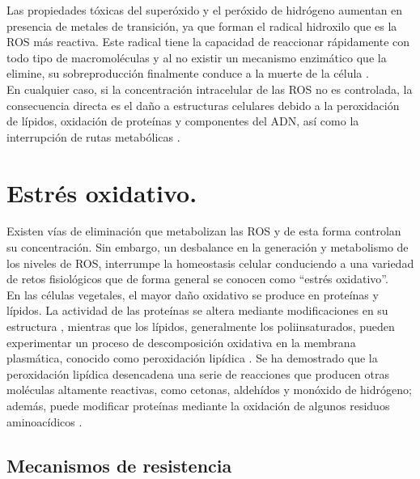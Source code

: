Las propiedades tóxicas del super\'oxido y el per\'oxido de hidr\'ogeno aumentan en presencia de metales de transici\'on, ya que forman el radical hidroxilo que es la ROS más reactiva. Este radical tiene la capacidad de reaccionar rápidamente con todo tipo de macromoléculas y al no existir un mecanismo enzimático que la elimine, su sobreproducción finalmente conduce a la muerte de la c\'elula \citep{moller2007oxidative, sharma2009relationship, gill2010reactive}.\\

En cualquier caso, si la concentración intracelular de las ROS no es controlada, la consecuencia directa es el daño a estructuras celulares debido a la peroxidación de lípidos, oxidación de proteínas y componentes del ADN, así como la interrupción de rutas metabólicas \citep{moller2007oxidative, imlay2008cellular}.\\

\section{Estr\'es oxidativo.}

Existen v\'ias de eliminaci\'on que metabolizan las ROS y de esta forma controlan su concentraci\'on. Sin embargo, un desbalance en la generaci\'on y metabolismo de los niveles de ROS, interrumpe la homeostasis celular conduciendo a una variedad de retos fisiol\'ogicos que de forma general se conocen como \textquotedblleft estr\'es oxidativo\textquotedblright \citep{pandey2014oxidative}.\\

En las c\'elulas vegetales, el mayor da\~no oxidativo se produce en prote\'inas y l\'ipidos.  La actividad de las prote\'inas se altera mediante modificaciones en su estructura \citep{grimm2012oxidative}, mientras que los l\'ipidos, generalmente los poliinsaturados, pueden experimentar un proceso de descomposici\'on oxidativa en la membrana plasm\'atica, conocido como peroxidaci\'on lip\'idica \citep{catala2016impact, gaschler2017lipid}. Se ha demostrado que la peroxidaci\'on lip\'idica desencadena una serie de reacciones que producen otras mol\'eculas altamente reactivas, como cetonas, aldeh\'idos y mon\'oxido de hidr\'ogeno; adem\'as, puede modificar prote\'inas mediante la oxidaci\'on de algunos residuos aminoac\'idicos \citep{farmer2013ros, reginato2015role}.

\subsection{Mecanismos de resistencia}

